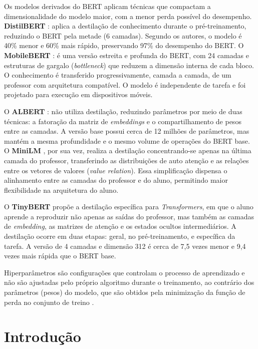 \documentclass[12pt]{article}
\begin{document}
           Os modelos derivados do BERT aplicam técnicas que compactam a dimensionalidade do modelo maior, com a menor perda possível do desempenho. \textbf{DistilBERT} \cite{sanh2019distilbert}: aplica a destilação de
conhecimento durante o pré-treinamento, reduzindo o BERT pela metade (6 camadas). Segundo os autores, o modelo é 40\% menor e 60\% mais rápido, preservando 97\% do desempenho do BERT. O \textbf{MobileBERT} \cite{sun2020mobilebert}: é uma versão estreita e profunda do BERT, com 24 camadas e estruturas de gargalo
(\textit{bottleneck}) que reduzem a dimensão interna de cada bloco. O conhecimento é transferido progressivamente, camada a camada, de um professor com arquitetura compatível. O modelo é independente de tarefa e foi projetado para execução em dispositivos móveis.

        O \textbf{ALBERT} \cite{lan2019albert}: não utiliza destilação, reduzindo parâmetros por meio de duas técnicas: a fatoração da matriz de \textit{embeddings} e o compartilhamento de pesos entre as camadas. A versão base possui cerca de 12 milhões de parâmetros, mas mantém a mesma profundidade e o mesmo volume de operações do BERT base. O \textbf{MiniLM} \cite{wang2020minilm}, por sua vez, realiza a destilação concentrando-se apenas na última camada do professor, transferindo as distribuições de auto atenção e as relações entre os vetores de valores (\textit{value relation}). Essa simplificação dispensa o alinhamento entre as camadas do professor e do aluno, permitindo maior flexibilidade na arquitetura do aluno.

    O \textbf{TinyBERT} \cite{jiao2019tinybert}  propõe a destilação específica para \textit{Transformers}, em que o aluno aprende a reproduzir não apenas as saídas do professor, mas também as camadas de \textit{embedding}, as
matrizes de atenção e os estados ocultos intermediários. A destilação ocorre em duas etapas: geral, no pré-treinamento, e específica da tarefa. A versão de 4 camadas e dimensão 312 é cerca de 7,5 vezes menor e
9,4 vezes mais rápida que o BERT base. 

        Hiperparâmetros são configurações que controlam o processo de aprendizado e não são ajustadas pelo próprio algoritmo durante o treinamento, ao contrário dos parâmetros (pesos) do modelo, que são obtidos pela minimização da função de perda no conjunto de treino \cite{goodfellow2016deep}. 
    



\section{Introdução}
\label{sec:introducao}
\end{document}
